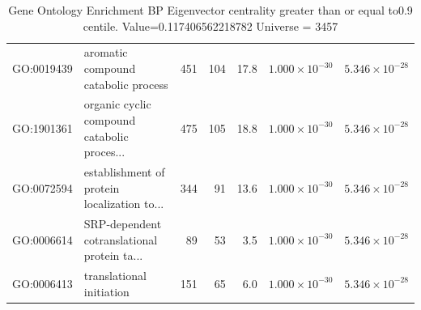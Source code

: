 \begin{table}[ht]
\begin{tabular}{llrrrrr}
  GO:0019439 & aromatic compound catabolic process & 451 & 104 & 17.8 & $1.000 \times 10^{-30}$ & $5.346 \times 10^{-28}$ \\ 
  GO:1901361 & organic cyclic compound catabolic proces... & 475 & 105 & 18.8 & $1.000 \times 10^{-30}$ & $5.346 \times 10^{-28}$ \\ 
  GO:0072594 & establishment of protein localization to... & 344 & 91 & 13.6 & $1.000 \times 10^{-30}$ & $5.346 \times 10^{-28}$ \\ 
  GO:0006614 & SRP-dependent cotranslational protein ta... & 89 & 53 & 3.5 & $1.000 \times 10^{-30}$ & $5.346 \times 10^{-28}$ \\ 
  GO:0006413 & translational initiation & 151 & 65 & 6.0 & $1.000 \times 10^{-30}$ & $5.346 \times 10^{-28}$ \\ 
   \hline
\end{tabular}
\caption{Gene Ontology Enrichment BP Eigenvector centrality  greater than or equal to0.9 centile.   Value=0.117406562218782 Universe = 3457} 
\label{tab:Gene Ontology Enrichment BP Eigenvector centrality  greater than or equal to0.9 centile.   Value=0.117406562218782 Universe = 3457}
\end{table}

